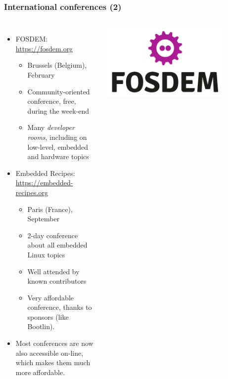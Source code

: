 \begin{frame}
  \frametitle{International conferences (2)}
  \begin{columns}
  \begin{itemize}
  \item FOSDEM: \url{https://fosdem.org}
    \begin{itemize}
    \item Brussels (Belgium), February
    \item Community-oriented conference, free, during the week-end
    \item Many {\em developer rooms}, including on low-level, embedded
      and hardware topics
    \end{itemize}
  \item Embedded Recipes: \url{https://embedded-recipes.org}
    \begin{itemize}
    \item Paris (France), September
    \item 2-day conference about all embedded Linux topics
    \item Well attended by known contributors
    \item Very affordable conference, thanks to sponsors (like Bootlin).
    \end{itemize}
  \item Most conferences are now also accessible on-line, which makes
    them much more affordable.
  \end{itemize}
    \begin{center}
      \includegraphics[width=0.8\textwidth]{slides/linux-references/fosdem.jpg}\\
      \vspace{1cm}

\end{center}
\end{columns}
\end{frame}
